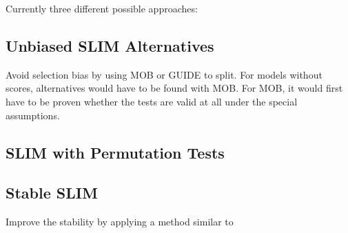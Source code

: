 Currently three different possible approaches:
\subsection{Unbiased SLIM Alternatives}
Avoid selection bias by using MOB or GUIDE to split. For models without scores, alternatives would have to be found with MOB. For MOB, it would first have to be proven whether the tests are valid at all under the special assumptions.

\subsection{SLIM with Permutation Tests}

\subsection{Stable SLIM}
Improve the stability by applying a method similar to \citep{Zhou.2018}

